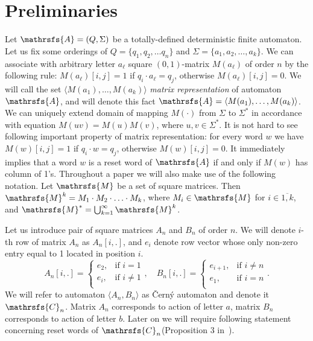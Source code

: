 \documentclass[11pt]{llncs}
\newcommand{\A}{\mathrsfs{A}}
\newcommand{\C}{\mathrsfs{C}}
\begin{document}
\section{Preliminaries}
Let $\A = (Q, \Sigma)$ be a totally-defined deterministic finite automaton. Let us fix some orderings 
of $Q = \{q_1, q_2, \ldots q_n\}$ and $\Sigma = \{a_1, a_2, \ldots, a_k\}$.
We can associate with arbitrary letter $a_\ell$
square $(0,1)$-matrix $M(a_\ell)$ of order $n$ by the following rule:
$M(a_\ell)[i,j] = 1$ if $q_i\cdot a_{\ell} = q_j$, otherwise $M(a_\ell)[i,j] = 0$.
We will call the set $\langle M(a_1), \ldots, M(a_{k})\rangle$  \emph{matrix representation} of automaton $\A$,
and will denote this fact $\A = \langle M(a_1), \ldots, M(a_{k})\rangle$. We can uniquely extend domain of mapping $M(\cdot )$ 
from $\Sigma$ to $\Sigma^{*}$ in accordance with equation $M(uv) = M(u)M(v)$, where $u,v \in \Sigma^*$.
It is not hard to see following important property of matrix representation: for every word $w$ we have
$M(w)[i,j] = 1$ if $q_i \cdot w = q_j$, otherwise $M(w)[i,j] = 0$. It immediately implies that
a word $w$ is a reset word of $\A$ if and only if $M(w)$ has column of 1's.
Throughout a paper we will also make use of the following notation. Let $\mathrsfs{M}$ be a set of square matrices.
Then $\mathrsfs{M}^{k} = M_1 \cdot M_2 \cdot \ldots \cdot M_k$, where $M_i \in \mathrsfs{M}$ for $i \in \overline{1,k}$,
and $\mathrsfs{M}^* = \bigcup_{k = 1}^{\infty} \mathrsfs{M}^k$.

Let us introduce pair of square matrices $A_n$ and $B_n$ of order $n$. We will denote $i$-th row of matrix
$A_n$ as $A_n[i,.]$, and $e_i$ denote row vector whose only non-zero entry equal to 1 located in position $i$.
$$ A_n[i,.] = 
\begin{cases}
e_2, &\text{if } i = 1\\
e_i, &\text{if } i \neq 1\\
\end{cases},\quad
B_n[i,.] = 
\begin{cases}
e_{i+1}, &\text{if } i \neq n\\
e_1, &\text{if } i = n\\
\end{cases}.
$$
We will refer to automaton $\langle A_n, B_n \rangle$ as \v{C}ern\'{y} automaton and denote it $\C_n$.
Matrix $A_n$ corresponds to action of letter $a$, matrix $B_n$ corresponds to action of letter $b$.
Later on we will require following statement concerning reset words of $\C_n$(Proposition 3 in~\cite{Gu}).
\end{document}
